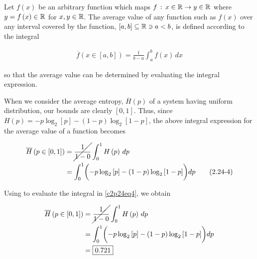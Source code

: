 \documentclass[ClusteringConnectionsMAIN.tex]{subfiles}
\begin{document}
	

  Let $f \left( x \right)$ be an arbitrary function which maps $f \, : \, x \in \mathbb{R} \rightarrow y \in \mathbb{R}$ where $y = f \left( x \right) \in \mathbb{R}$ for $x, y \in \mathbb{R}$.  The average value of any function such as $f \left( x \right)$ over any interval covered by the function, $\left[ a, b \right] \subseteq \mathbb{R} \ni a < b$, is defined according to the integral

\begin{align*}
\overline{ f } \left( x \in \left[ a, b \right] \right) = \frac{1}{b - a} \int_a^b f \left( x \right) \, dx
\end{align*}

so that the average value can be determined by evaluating the integral expression.  \newline


When we consider the average entropy, $\overline{ H } \left( p \right)$ of a system having uniform distribution, our bounds are clearly $\left[ 0, 1 \right]$.  Thus, since $H \left( p \right) = - p \log_2 \left[ p \right] - \left( 1 - p \right) \log_2 \left[ 1 - p \right]$, the above integral expression for the average value of a function becomes


\begin{align} \label{c2p24eq4}
\overline{ H } \left( p \in \left[ 0, 1 \right] \right) &= \cancel{ \frac{1}{1 - 0} } \int_0^1 H \left( p \right) \, dp  \notag \\
&= \int_0^1  \biggl( - p \log_2 \left[ p \right] - \left( 1 - p \right) \log_2 \left[ 1 - p \right] \biggr) dp \tag{2.24-4}
\end{align}

Using \MMA to evaluate the integral in \ref{c2p24eq4}, we obtain 

\begin{align*} 
\overline{ H } \left( p \in \left[ 0, 1 \right] \right) &= \cancel{ \frac{1}{1 - 0} } \int_0^1 H \left( p \right) \, dp  \notag \\
&= \int_0^1  \biggl( - p \log_2 \left[ p \right] - \left( 1 - p \right) \log_2 \left[ 1 - p \right] \biggr) dp \\
&= \boxed{0.721}
\end{align*}
\end{document}
